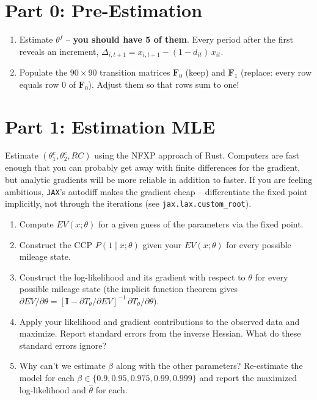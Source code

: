 \documentclass{article}
\begin{document}
\section*{Part 0: Pre-Estimation}
\begin{enumerate}
\item Estimate $\theta^f$ -- \textbf{you should have 5 of them}. Every period after the first reveals an increment, $\Delta_{i,t+1} = x_{i,t+1} - (1-d_{it})\,x_{it}$.
\item Populate the $90 \times 90$ transition matrices $\mathbf F_0$ (keep) and $\mathbf F_1$ (replace: every row equals row 0 of $\mathbf F_0$). Adjust them so that rows sum to one!
\end{enumerate}

\section*{Part 1: Estimation MLE}
Estimate $(\theta^c_1, \theta^c_2, RC)$ using the NFXP approach of Rust. Computers are fast enough that you can probably get away with finite differences for the gradient, but analytic gradients will be more reliable in addition to faster. If you are feeling ambitious, \texttt{JAX}'s autodiff makes the gradient cheap -- differentiate the fixed point implicitly, not through the iterations (see \texttt{jax.lax.custom\_root}).
\begin{enumerate}
\item Compute $EV(x;\theta)$ for a given guess of the parameters via the fixed point.
\item Construct the CCP $P(1 \mid x;\theta)$ given your $EV(x;\theta)$ for every possible mileage state.
\item Construct the log-likelihood and its gradient with respect to $\theta$ for every possible mileage state (the implicit function theorem gives $\partial EV/\partial\theta = [\mathbf I - \partial T_\theta/\partial EV]^{-1}\, \partial T_\theta/\partial\theta$).
\item Apply your likelihood and gradient contributions to the observed data and maximize. Report standard errors from the inverse Hessian. What do these standard errors ignore?
\item Why can't we estimate $\beta$ along with the other parameters? Re-estimate the model for each $\beta \in \{0.9,\allowbreak 0.95,\allowbreak 0.975,\allowbreak 0.99,\allowbreak 0.999\}$ and report the maximized log-likelihood and $\hat\theta$ for each.
\end{enumerate}
\end{document}
